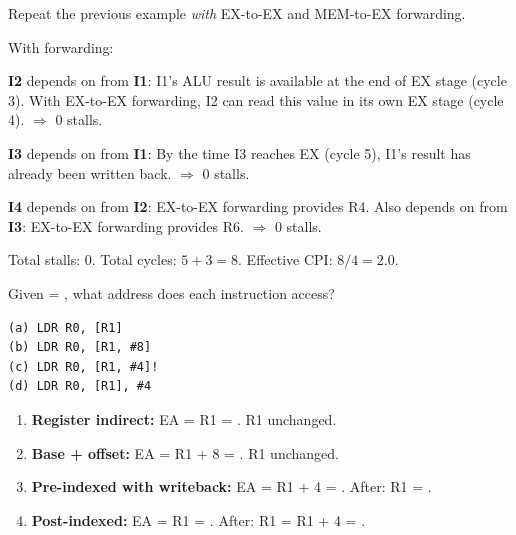 \begin{example}
Repeat the previous example \emph{with} EX-to-EX and MEM-to-EX forwarding.

\begin{solution}
With forwarding:

\textbf{I2} depends on  from \textbf{I1}: I1's ALU result is available at the end of EX stage (cycle 3). With EX-to-EX forwarding, I2 can read this value in its own EX stage (cycle 4). $\Rightarrow$ 0 stalls.

\textbf{I3} depends on  from \textbf{I1}: By the time I3 reaches EX (cycle 5), I1's result has already been written back. $\Rightarrow$ 0 stalls.

\textbf{I4} depends on  from \textbf{I2}: EX-to-EX forwarding provides R4. Also depends on  from \textbf{I3}: EX-to-EX forwarding provides R6. $\Rightarrow$ 0 stalls.

Total stalls: 0. Total cycles: $5 + 3 = 8$. Effective CPI: $8/4 = 2.0$.

\end{solution}
\end{example}

\begin{example}
Given  = , what address does each instruction access?
\begin{lstlisting}[style=ARM, numbers=none]
(a) LDR R0, [R1]          
(b) LDR R0, [R1, #8]      
(c) LDR R0, [R1, #4]!     
(d) LDR R0, [R1], #4      
\end{lstlisting}

\begin{solution}
\begin{enumerate}[label=(\alph*)]
  \item \textbf{Register indirect:} EA = R1 = . R1 unchanged.
  \item \textbf{Base + offset:} EA = R1 + 8 = . R1 unchanged.
  \item \textbf{Pre-indexed with writeback:} EA = R1 + 4 = . After: R1 = .
  \item \textbf{Post-indexed:} EA = R1 = . After: R1 = R1 + 4 = .
\end{enumerate}
\end{solution}
\end{example}

